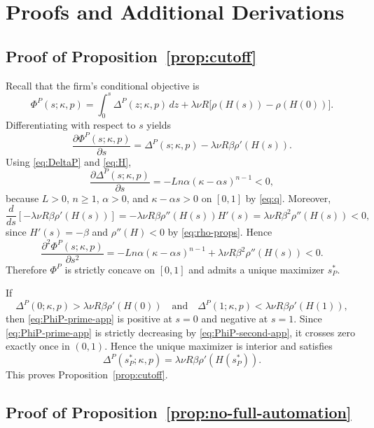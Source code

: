 \section{Proofs and Additional Derivations}
\label{app:proofs}

\subsection*{Proof of Proposition~\ref{prop:cutoff}}

Recall that the firm's conditional objective is
\[
\Phi^P(s;\kappa,p)
=
\int_0^s \Delta^P(z;\kappa,p)\,dz
+
\lambda \nu R \bigl[\rho(H(s))-\rho(H(0))\bigr].
\]
Differentiating with respect to $s$ yields
\begin{equation}
\label{eq:PhiP-prime-app}
\frac{\partial \Phi^P(s;\kappa,p)}{\partial s}
=
\Delta^P(s;\kappa,p)-\lambda \nu R \beta \rho'(H(s)).
\end{equation}
Using \eqref{eq:DeltaP} and \eqref{eq:H},
\[
\frac{\partial \Delta^P(s;\kappa,p)}{\partial s}
=
-Ln\alpha(\kappa-\alpha s)^{n-1}<0,
\]
because $L>0$, $n\ge 1$, $\alpha>0$, and $\kappa-\alpha s>0$ on $[0,1]$ by \eqref{eq:q}. Moreover,
\[
\frac{d}{ds}\!\left[-\lambda \nu R \beta \rho'(H(s))\right]
=
-\lambda \nu R \beta \rho''(H(s))H'(s)
=
\lambda \nu R \beta^2 \rho''(H(s))<0,
\]
since $H'(s)=-\beta$ and $\rho''(H)<0$ by \eqref{eq:rho-props}. Hence
\begin{equation}
\label{eq:PhiP-second-app}
\frac{\partial^2 \Phi^P(s;\kappa,p)}{\partial s^2}
=
-Ln\alpha(\kappa-\alpha s)^{n-1}
+
\lambda \nu R \beta^2 \rho''(H(s))
<0.
\end{equation}
Therefore $\Phi^P$ is strictly concave on $[0,1]$ and admits a unique maximizer $s_P^\ast$.

If
\[
\Delta^P(0;\kappa,p)>\lambda \nu R \beta \rho'(H(0))
\quad\text{and}\quad
\Delta^P(1;\kappa,p)<\lambda \nu R \beta \rho'(H(1)),
\]
then \eqref{eq:PhiP-prime-app} is positive at $s=0$ and negative at $s=1$. Since \eqref{eq:PhiP-prime-app} is strictly decreasing by \eqref{eq:PhiP-second-app}, it crosses zero exactly once in $(0,1)$. Hence the unique maximizer is interior and satisfies
\[
\Delta^P(s_P^\ast;\kappa,p)=\lambda \nu R \beta \rho'(H(s_P^\ast)).
\]
This proves Proposition~\ref{prop:cutoff}.

\subsection*{Proof of Proposition~\ref{prop:no-full-automation}}

